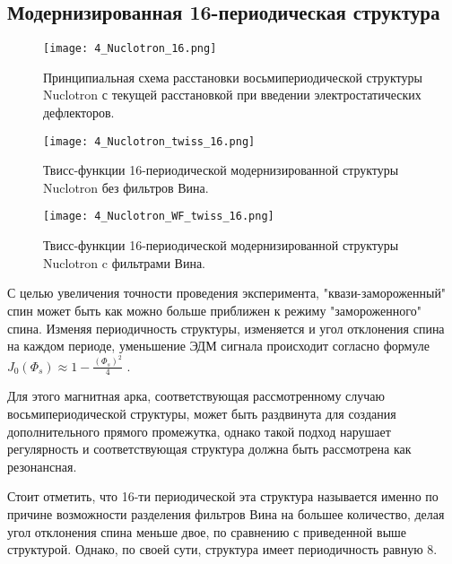 \newpage
	\subsection{Модернизированная 16-периодическая структура}\label{sec:EDM/optics/16period}

\begin{figure}[!h]
  \centering
   \texttt{[image: 4\_Nuclotron\_16.png]}
   \caption{Принципиальная схема расстановки восьмипериодической структуры Nuclotron с текущей расстановкой при введении электростатических дефлекторов.}
   \label{fig:4_Nuclotron_16}
\end{figure}

\begin{figure}[!h]
  \centering
   \texttt{[image: 4\_Nuclotron\_twiss\_16.png]}
   \caption{Твисс-функции 16-периодической модернизированной структуры Nuclotron без фильтров Вина.}
   \label{fig:4_Nuclotron_twiss_16}
\end{figure}

\begin{figure}[!h]
  \centering
   \texttt{[image: 4\_Nuclotron\_WF\_twiss\_16.png]}
   \caption{Твисс-функции 16-периодической модернизированной структуры Nuclotron c фильтрами Вина.}
   \label{fig:4_Nuclotron_twiss_16}
\end{figure}

\par С целью увеличения точности проведения эксперимента, "квази-замороженный" спин может быть как можно больше приближен к режиму "замороженного" спина. Изменяя периодичность структуры, изменяется и угол отклонения спина на каждом периоде, уменьшение ЭДМ сигнала происходит согласно формуле $J_0\left(\Phi_s\right) \approx 1-\frac{\left(\Phi_s\right)^2}{4}$  \cite{Senichev:2023_nuclotron}. 

\par Для этого магнитная арка, соответствующая рассмотренному случаю восьмипериодической структуры, может быть раздвинута для создания дополнительного прямого промежутка, однако такой подход нарушает регулярность и соответствующая структура должна быть рассмотрена как резонансная.

\par Стоит отметить, что 16-ти периодической эта структура называется именно по причине возможности разделения фильтров Вина на большее количество, делая угол отклонения спина меньше двое, по сравнению с приведенной выше структурой. Однако, по своей сути, структура имеет периодичность равную 8.

